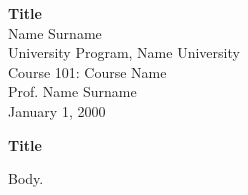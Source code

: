 \documentclass[12pt, letterpaper]{article}
\begin{document}
\vspace*{4\baselineskip}
\begin{center}
    \textbf{Title} \\
    \vspace*{\baselineskip}
    Name Surname \\
    University Program, Name University \\
    Course 101: Course Name \\
    Prof. Name Surname \\
    January 1, 2000
\end{center}
\newpage

\begin{center}\textbf{Title}\end{center}

Body.

\end{document}
